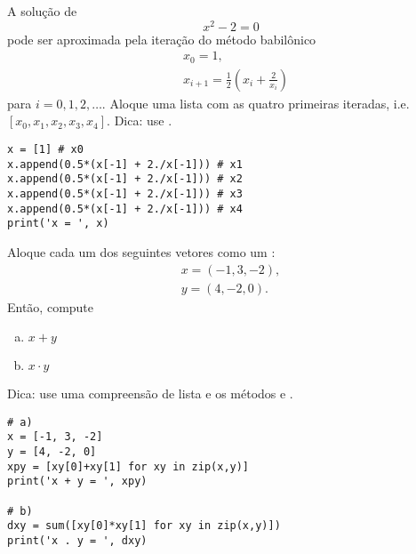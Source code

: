 \begin{exer}
  A solução de
  \begin{equation}
    x^2 - 2 = 0
  \end{equation}
  pode ser aproximada pela iteração do método babilônico
  \begin{align}
    &x_0 = 1,\\
    &x_{i+1} = \frac{1}{2}\left(x_{i} + \frac{2}{x_i}\right)
  \end{align}
  para $i = 0, 1, 2, \ldots$. Aloque uma lista com as quatro primeiras iteradas, i.e. $[x_0, x_1, x_2,\allowbreak x_3, x_4]$. Dica: use {\PYTHONlistDOTappend}.
\end{exer}
\begin{resp}
  
\begin{lstlisting}
x = [1] # x0
x.append(0.5*(x[-1] + 2./x[-1])) # x1
x.append(0.5*(x[-1] + 2./x[-1])) # x2
x.append(0.5*(x[-1] + 2./x[-1])) # x3
x.append(0.5*(x[-1] + 2./x[-1])) # x4
print('x = ', x)
\end{lstlisting}

\end{resp}

\begin{exer}
  Aloque cada um dos seguintes vetores como um {\PYTHONlist}:
  \begin{align}
    x = (-1, 3, -2),\\
    y = (4, -2, 0).
  \end{align}
  Então, compute
  \begin{enumerate}[a)]
  \item $x+y$
  \item $x\cdot y$
  \end{enumerate}
  Dica: use uma compreensão de lista e os métodos {\PYTHONzip} e {\PYTHONsum}.
\end{exer}
\begin{resp}

\begin{lstlisting}
# a)
x = [-1, 3, -2]
y = [4, -2, 0]
xpy = [xy[0]+xy[1] for xy in zip(x,y)]
print('x + y = ', xpy)

# b)
dxy = sum([xy[0]*xy[1] for xy in zip(x,y)])
print('x . y = ', dxy)
\end{lstlisting}

\end{resp}

